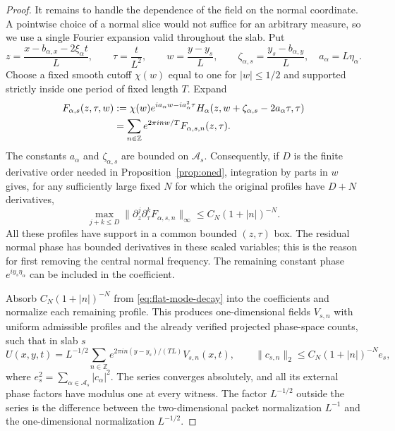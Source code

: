 \begin{proof}
It remains to handle the dependence of the field on the normal
coordinate.  A pointwise choice of a normal slice would not suffice
for an arbitrary measure, so we use a single Fourier expansion
valid throughout the slab.  Put
\[
 z=\frac{x-b_{\alpha,x}-2\xi_\alpha t}{L},\qquad
 \tau=\frac{t}{L^2},\qquad w=\frac{y-y_s}{L},\qquad
 \zeta_{\alpha,s}=\frac{y_s-b_{\alpha,y}}L,
 \quad a_\alpha=L\eta_\alpha.
\]
Choose a fixed smooth cutoff $\chi(w)$ equal to one for
$|w|\leq1/2$ and supported strictly inside one period of fixed length
$T$.  Expand
\begin{align}
 F_{\alpha,s}(z,\tau,w)
   &:=\chi(w)e^{i a_\alpha w-i a_\alpha^2\tau}
       H_\alpha(z,w+\zeta_{\alpha,s}-2a_\alpha\tau,\tau)
       \notag\\
   &=\sum_{n\in\mathbb Z}e^{2\pi i n w/T}
                          F_{\alpha,s,n}(z,\tau).
       \label{eq:flat-normal-series}
\end{align}
The constants $a_\alpha$ and $\zeta_{\alpha,s}$ are bounded on
$\mathcal A_s$.  Consequently, if $D$ is the finite derivative order
needed in Proposition~\ref{prop:oned}, integration by parts in $w$
gives, for any sufficiently large fixed $N$ for which the original
profiles have $D+N$ derivatives,
\begin{equation}\label{eq:flat-mode-decay}
 \max_{j+k\leq D}
  \|\partial_z^j\partial_\tau^kF_{\alpha,s,n}\|_\infty
       \leq C_N(1+|n|)^{-N}.
\end{equation}
All these profiles have support in a common bounded $(z,\tau)$ box.
The residual normal phase has bounded derivatives in these scaled
variables; this is the reason for first removing the central normal
frequency.  The remaining constant phase
$e^{iy_s\eta_\alpha}$ can be included in the coefficient.

Absorb $C_N(1+|n|)^{-N}$ from \eqref{eq:flat-mode-decay} into the
coefficients and normalize each remaining profile.  This produces
one-dimensional fields $V_{s,n}$ with uniform admissible profiles and
the already verified projected phase-space counts, such that in
slab $s$
\begin{equation}\label{eq:flat-strip-series}
 U(x,y,t)=L^{-1/2}\sum_{n\in\mathbb Z}
       e^{2\pi i n (y-y_s)/(TL)}V_{s,n}(x,t),
 \qquad
 \|c_{s,n}\|_2\leq C_N(1+|n|)^{-N}e_s,
\end{equation}
where $e_s^2=\sum_{\alpha\in\mathcal A_s}|c_\alpha|^2$.
The series converges absolutely, and all its external phase factors
have modulus one at every witness.  The factor $L^{-1/2}$ outside
the series is the difference between the two-dimensional packet
normalization $L^{-1}$ and the one-dimensional normalization
$L^{-1/2}$.


\end{proof}
